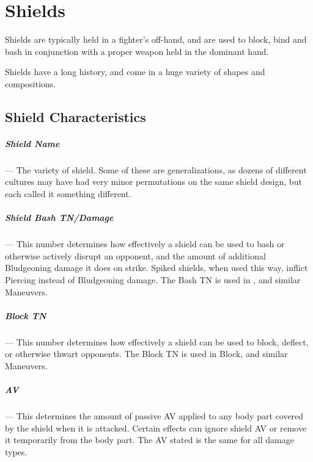 \documentclass[oneside,11pt,english]{book}
\begin{document}
\chapter{Shields}\label{ch:Shields}
\startcontents[chapters]
\newpage
Shields are typically held in a fighter’s off-hand, and are used to block, bind and bash in conjunction with 
a proper weapon held in the dominant hand. 

Shields have a long history, and come in a huge variety of shapes and compositions.

\section{Shield Characteristics}
\paragraph{Shield Name}---\quad
The variety of shield. Some of these are generalizations, as dozens of different cultures may have had 
very minor permutations on the same shield design, but each called it something different. 


\vspace{-10pt}\paragraph{Shield Bash TN/Damage}---\quad
This number determines how effectively a shield can be used to bash or otherwise
actively disrupt an opponent, and the amount of additional Bludgeoning damage it
does on strike. Spiked shields, when used this way, inflict Piercing instead of
Bludgeoning damage. The Bash TN is used in , and
similar Maneuvers. 

\vspace{-10pt}\paragraph{Block TN}---\quad
This number determines how effectively a shield can be used to block, deflect, or otherwise thwart 
opponents. The Block TN is used in Block, and similar Maneuvers. 

\vspace{-10pt}\paragraph{AV}---\quad
This determines the amount of passive AV applied to any body part covered by the
shield when it is attacked. Certain effects can ignore shield AV or remove it
temporarily from the body part. The AV stated is the same for all damage types. 
\end{document}
